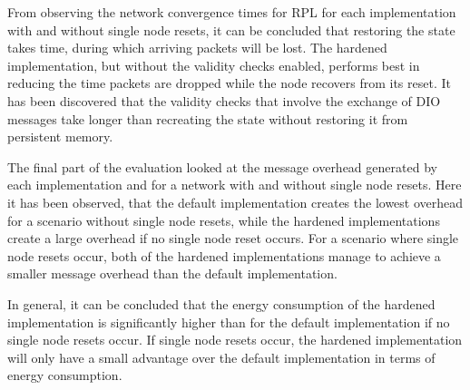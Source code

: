 From observing the network convergence times for \ac{RPL} for each
implementation with and without single node resets, it can be concluded that
restoring the state takes time, during which arriving packets will be lost. The
hardened implementation, but without the validity checks enabled, performs best in
reducing the time packets are dropped while the node recovers from its reset. It
has been discovered that the validity checks that involve the exchange of
\ac{DIO} messages take longer than recreating the state without restoring it
from persistent memory.

The final part of the evaluation looked at the message overhead generated by
each implementation and for a network with and without single node resets. Here
it has been observed, that the default implementation creates the lowest
overhead for a scenario without single node resets, while the hardened
implementations create a large overhead if no single node reset occurs. For a
scenario where single node resets occur, both of the hardened implementations
manage to achieve a smaller message overhead than the default implementation.

In general, it can be concluded that the energy consumption of the hardened
implementation is significantly higher than for the default implementation if no
single node resets occur. If single node resets occur, the hardened
implementation will only have a small advantage over the default implementation
in terms of energy consumption.